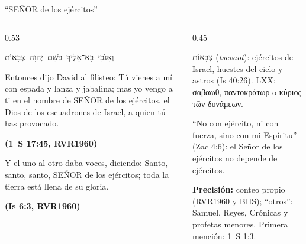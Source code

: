 \documentclass[hyperref={bookmarks=false},aspectratio=169]{beamer}
\newcommand{\heb}[1]{\mbox{\foreignlanguage{hebrew}{#1}}}
\newcommand{\grc}[1]{\foreignlanguage{ancientgreek}{#1}}
\newcommand{\SENOR}{S{\fontsize{0.78em}{1em}\selectfont EÑOR}}
\newcommand{\fuente}[1]{\par\hfill{\upshape\bfseries\footnotesize\textcolor{azul}{#1}}}
\begin{document}
\begin{frame}{``\SENOR{} de los ejércitos''}
\begin{columns}[t,onlytextwidth]
\begin{column}{0.53\textwidth}
\begin{center}\scriptsize\heb{וְאָנֹכִי בָא־אֵלֶיךָ בְּשֵׁם יְהוָה צְבָאוֹת}\end{center}
\begin{cita}[fontupper=\scriptsize\itshape]Entonces dijo David al filisteo: Tú vienes a mí con espada y lanza y jabalina; mas yo vengo a ti en el nombre de \SENOR{} de los ejércitos, el Dios de los escuadrones de Israel, a quien tú has provocado.\fuente{(1~S 17:45, RVR1960)}\end{cita}
\begin{cita}[fontupper=\scriptsize\itshape]Y el uno al otro daba voces, diciendo: Santo, santo, santo, \SENOR{} de los ejércitos; toda la tierra está llena de su gloria.\fuente{(Is 6:3, RVR1960)}\end{cita}
\end{column}
\begin{column}{0.45\textwidth}
\centering
{}\par\smallskip
\scriptsize \heb{צְבָאוֹת} (\emph{tsevaot}): ejércitos de Israel, huestes del cielo y astros (Is 40:26). LXX: \grc{σαβαωθ}, \grc{παντοκράτωρ} o \grc{κύριος τῶν δυνάμεων}.\par\smallskip
``No con ejército, ni con fuerza, sino con mi Espíritu'' (Zac 4:6): el Señor de los ejércitos no depende de ejércitos.\par\smallskip
{\fontsize{6}{7}\selectfont\color{gris}\textbf{Precisión:} conteo propio (RVR1960 y BHS); ``otros'': Samuel, Reyes, Crónicas y profetas menores. Primera mención: 1~S 1:3.\par}
\end{column}
\end{columns}
\end{frame}
\end{document}
